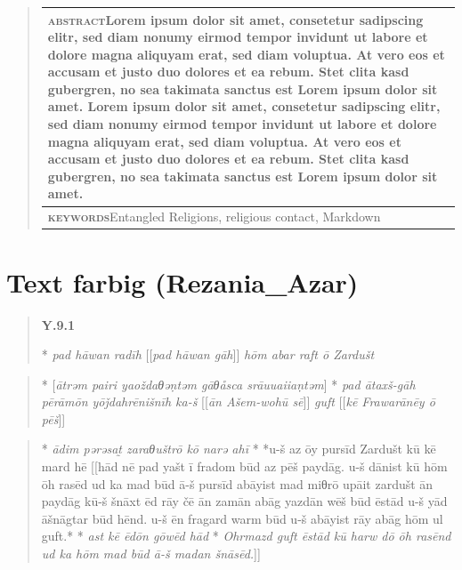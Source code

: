 \documentclass[
  english,
  a4paper,
  DIV=12,
  footlines=2.1,
  usegeometry=true]{scrartcl}
\begin{document}
\begin{quote}
\small
\begin{tabular}{@{}p{\linewidth}@{}}
\toprule
{\bfseries\scshape abstract}\hspace{1em}Lorem ipsum dolor sit amet,
consetetur sadipscing elitr, sed diam nonumy eirmod tempor invidunt ut
labore et dolore magna aliquyam erat, sed diam voluptua. At vero eos et
accusam et justo duo dolores et ea rebum. Stet clita kasd gubergren, no
sea takimata sanctus est Lorem ipsum dolor sit amet. Lorem ipsum dolor
sit amet, consetetur sadipscing elitr, sed diam nonumy eirmod tempor
invidunt ut labore et dolore magna aliquyam erat, sed diam voluptua. At
vero eos et accusam et justo duo dolores et ea rebum. Stet clita kasd
gubergren, no sea takimata sanctus est Lorem ipsum dolor sit amet.\\
\midrule[\heavyrulewidth]
{\bfseries\scshape keywords}\hspace{1em}Entangled Religions, religious
contact, Markdown\\
\bottomrule
\end{tabular}
\end{quote}
\vspace{1.8181\baselineskip} %

\hypertarget{text-farbig-rezania_azar}{%
\section{Text farbig (Rezania\_Azar)}\label{text-farbig-rezania_azar}}

\begin{quote}
\leavevmode\marginpar{\textcolor{parnum}{{[}1{]}}}\textbf{Y.9.1}

\leavevmode{} * \emph{pad hāwan radīh}
{{[}{[}\emph{pad hāwan gāh}{]}{]}} \emph{hōm abar raft ō Zardušt}
\end{quote}

\begin{quote}
\leavevmode\marginpar{\textcolor{parnum}{{[}3{]}}}* {{[}\emph{ātrǝm
pairi yaoždaθǝṇtǝm gāθåsca srāuuaiiaṇtǝm}{]}} * \emph{pad ātaxš-gāh
pērāmōn yōǰdahrēnišnīh ka-š} {{[}{[}\emph{ān Ašem-wohū sē}{]}{]}}
\emph{guft} {{[}{[}\emph{kē Frawarānēy ō pēš}{]}{]}}
\end{quote}

\begin{quote}
\leavevmode\marginpar{\textcolor{parnum}{{[}4{]}}}* {\emph{ādim pǝrǝsat̰
zaraθuštrō kō narǝ ahī}} * *u-š az ōy pursīd Zardušt kū kē mard hē
{{[}{[}hād nē pad yašt ī fradom būd az pēš paydāg. u-š dānist kū hōm ōh
rasēd ud ka mad būd ā-š pursīd abāyist mad miθrō upāit zardušt ān paydāg
kū-š šnāxt ēd rāy čē ān zamān abāg yazdān wēš būd ēstād u-š yād āšnāgtar
būd hēnd. u-š ēn fragard warm būd u-š abāyist rāy abāg hōm ul guft.* *
\emph{ast kē ēdōn gōwēd hād} * \emph{Ohrmazd guft ēstād kū harw dō ōh
rasēnd ud ka hōm mad būd ā-š madan šnāsēd.}{]}{]}}
\end{quote}
\end{document}
